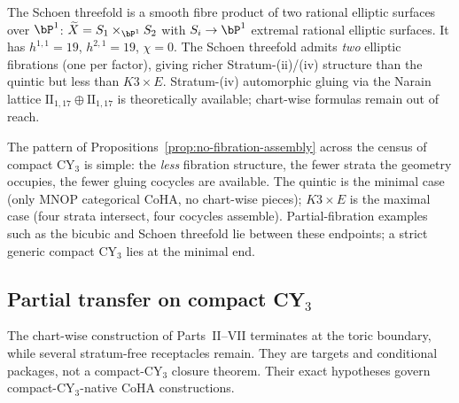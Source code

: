 \begin{example}
\label{ex:schoen}
The Schoen threefold is a smooth fibre product of two rational elliptic
surfaces over $\bP^1$: $\widetilde X = S_1 \times_{\bP^1} S_2$ with
$S_i \to \bP^1$ extremal rational elliptic surfaces. It has
$h^{1,1} = 19$, $h^{2,1} = 19$, $\chi = 0$. The Schoen threefold
admits \emph{two} elliptic fibrations (one per factor), giving richer
Stratum-(ii)/(iv) structure than the quintic but less than
$K3 \times E$. Stratum-(iv) automorphic gluing via the Narain lattice
$\mathrm{II}_{1,17} \oplus \mathrm{II}_{1,17}$ is theoretically available;
chart-wise formulas remain out of reach.
\end{example}

The pattern of Propositions~\ref{prop:no-fibration-assembly} across the
census of compact CY$_3$ is simple: the \emph{less} fibration structure,
the fewer strata the geometry occupies, the fewer gluing cocycles are
available. The quintic is the minimal case (only MNOP categorical CoHA,
no chart-wise pieces); $K3 \times E$ is the maximal case (four strata
intersect, four cocycles assemble). Partial-fibration examples such as
the bicubic and Schoen threefold lie between these endpoints; a strict
generic compact CY$_3$ lies at the minimal end.
\subsection{Partial transfer on compact CY$_3$}
\label{sec:partial-transfer}

The chart-wise construction of Parts~II--VII terminates at the
toric boundary, while several stratum-free receptacles remain. They are
targets and conditional packages, not a compact-CY$_3$ closure theorem.
Their exact hypotheses govern compact-CY$_3$-native CoHA constructions.


